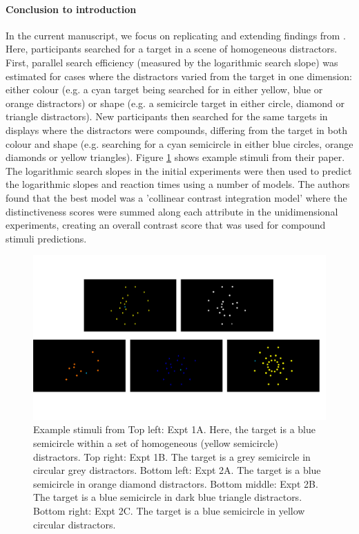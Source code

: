 \documentclass[smallextended, natbib]{svjour3}       %
\begin{document}
\paragraph{Conclusion to introduction} 
In the current manuscript, we focus on replicating and extending findings from \cite{buetti2019predicting}. Here, participants searched for a target in a scene of homogeneous distractors. First, parallel search efficiency (measured by the logarithmic search slope) was estimated for cases where the distractors varied from the target in one dimension: either colour (e.g. a cyan target being searched for in either yellow, blue or orange distractors) or shape (e.g. a semicircle target in either circle, diamond or triangle distractors). New participants then searched for the same targets in displays where the distractors were compounds, differing from the target in both colour and shape (e.g. searching for a cyan semicircle in either blue circles, orange diamonds or yellow triangles). Figure \ref{fig:buetti2019_stimulus} shows example stimuli from their paper. The logarithmic search slopes in the initial experiments were then used to predict the logarithmic slopes and reaction times using a number of models. The authors found that the best model was a 'collinear contrast integration model' where the distinctiveness scores were summed along each attribute in the unidimensional experiments, creating an overall contrast score that was used for compound stimuli predictions.

\begin{figure}
\centering
\includegraphics[width=\textwidth]{../plots/example_stimuli_figure.pdf}
\caption{Example stimuli from \cite{buetti2019predicting} Top left: Expt 1A. Here, the target is a blue semicircle within a set of homogeneous (yellow semicircle) distractors. Top right: Expt 1B. The target is a grey semicircle in circular grey distractors. Bottom left: Expt 2A. The target is a blue semicircle in orange diamond distractors. Bottom middle: Expt 2B. The target is a blue semicircle in dark blue triangle distractors. Bottom right: Expt 2C. The target is a blue semicircle in yellow circular distractors.}
\label{fig:buetti2019_stimulus}
\end{figure}
\end{document}
